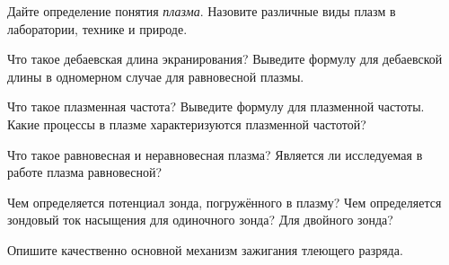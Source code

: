 \begin{lab:questions}
    \item Дайте определение понятия \emph{плазма}.
    Назовите различные виды плазм в лаборатории, технике и природе.
    
    \item Что такое дебаевская длина экранирования? Выведите формулу
    для дебаевской длины в одномерном случае для равновесной плазмы.
    
    \item Что такое плазменная частота? Выведите формулу для плазменной частоты.
    Какие процессы в плазме характеризуются плазменной частотой?
    
    \item Что такое равновесная и неравновесная плазма? 
    Является ли исследуемая в работе плазма равновесной?
    
   \item Чем определяется потенциал зонда, погружённого в плазму?
   Чем определяется зондовый ток насыщения для одиночного зонда? Для двойного
   зонда?
    
    
    \item Опишите качественно основной механизм зажигания тлеющего разряда.
\end{lab:questions}


